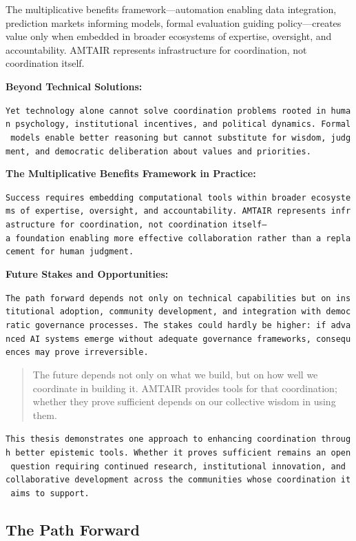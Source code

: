 \documentclass[
  11pt,
  letterpaper,
]{book}
\begin{document}
The multiplicative benefits framework---automation enabling data
integration, prediction markets informing models, formal evaluation
guiding policy---creates value only when embedded in broader ecosystems
of expertise, oversight, and accountability. AMTAIR represents
infrastructure for coordination, not coordination itself.

\textbf{Beyond Technical Solutions:}

\texttt{Yet\ technology\ alone\ cannot\ solve\ coordination\ problems\ rooted\ in\ human\ psychology,\ institutional\ incentives,\ and\ political\ dynamics.\ Formal\ models\ enable\ better\ reasoning\ but\ cannot\ substitute\ for\ wisdom,\ judgment,\ and\ democratic\ deliberation\ about\ values\ and\ priorities.}

\textbf{The Multiplicative Benefits Framework in Practice:}

\texttt{Success\ requires\ embedding\ computational\ tools\ within\ broader\ ecosystems\ of\ expertise,\ oversight,\ and\ accountability.\ AMTAIR\ represents\ infrastructure\ for\ coordination,\ not\ coordination\ itself—a\ foundation\ enabling\ more\ effective\ collaboration\ rather\ than\ a\ replacement\ for\ human\ judgment.}

\textbf{Future Stakes and Opportunities:}

\texttt{The\ path\ forward\ depends\ not\ only\ on\ technical\ capabilities\ but\ on\ institutional\ adoption,\ community\ development,\ and\ integration\ with\ democratic\ governance\ processes.\ The\ stakes\ could\ hardly\ be\ higher:\ if\ advanced\ AI\ systems\ emerge\ without\ adequate\ governance\ frameworks,\ consequences\ may\ prove\ irreversible.}

\begin{quote}
The future depends not only on what we build, but on how well we
coordinate in building it. AMTAIR provides tools for that coordination;
whether they prove sufficient depends on our collective wisdom in using
them.
\end{quote}

\texttt{This\ thesis\ demonstrates\ one\ approach\ to\ enhancing\ coordination\ through\ better\ epistemic\ tools.\ Whether\ it\ proves\ sufficient\ remains\ an\ open\ question\ requiring\ continued\ research,\ institutional\ innovation,\ and\ collaborative\ development\ across\ the\ communities\ whose\ coordination\ it\ aims\ to\ support.}

\subsection{The Path Forward}\label{sec-path-forward}
\end{document}
